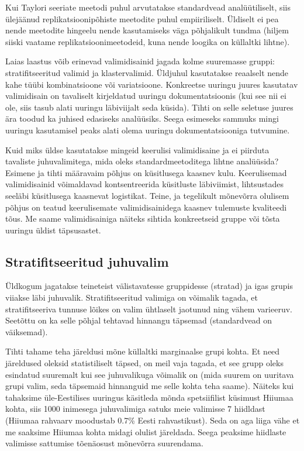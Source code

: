 \documentclass[
]{book}
\begin{document}
Kui Taylori seeriate meetodi puhul arvutatakse standardvead analüütiliselt, siis ülejäänud replikatsioonipõhiste meetodite puhul empiiriliselt. Üldiselt ei pea nende meetodite hingeelu nende kasutamiseks väga põhjalikult tundma (hiljem siiski vaatame replikatsioonimeetodeid, kuna nende loogika on küllaltki lihtne).

Laias laastus võib erinevad valimidisainid jagada kolme suuremasse gruppi: stratifitseeritud valimid ja klastervalimid. Üldjuhul kasutatakse reaalselt nende kahe tüübi kombinatsioone või variatsioone. Konkreetse uuringu juures kasutatav valimidisain on tavaliselt kirjeldatud uuringu dokumentatsioonis (kui see nii ei ole, siis tasub alati uuringu läbiviijalt seda küsida). Tihti on selle seletuse juures ära toodud ka juhised edasiseks analüüsiks. Seega esimeseks sammuks mingi uuringu kasutamisel peaks alati olema uuringu dokumentatsiooniga tutvumine.

Kuid miks üldse kasutatakse mingeid keerulisi valimidisaine ja ei piirduta tavaliste juhuvalimitega, mida oleks standardmeetoditega lihtne analüüsida? Esimene ja tihti määravaim põhjus on küsitlusega kaasnev kulu. Keerulisemad valimidisainid võimaldavad kontsentreerida küsitluste läbiviimist, lihtsustades seeläbi küsitlusega kaasnevat logistikat. Teine, ja tegelikult mõnevõrra olulisem põhjus on teatud keerulisemate valimidisainidega kaasnev tulemuste kvaliteedi tõus. Me saame valimidisainiga näiteks sihtida konkreetseid gruppe või tõsta uuringu üldist täpsusastet.

\hypertarget{stratifitseeritud-juhuvalim}{%
\subsection{Stratifitseeritud juhuvalim}\label{stratifitseeritud-juhuvalim}}

Üldkogum jagatakse teineteist välistavatesse gruppidesse (stratad) ja igas grupis viiakse läbi juhuvalik. Stratifitseeritud valimiga on võimalik tagada, et stratifitseeriva tunnuse lõikes on valim ühtlaselt jaotunud ning vähem varieeruv. Seetõttu on ka selle põhjal tehtavad hinnangu täpsemad (standardvead on väiksemad).

Tihti tahame teha järeldusi mõne küllaltki marginaalse grupi kohta. Et need järeldused oleksid statistiliselt täpsed, on meil vaja tagada, et see grupp oleks esindatud suuremalt kui see juhuvalikuga võimalik on (mida suurem on uuritava grupi valim, seda täpsemaid hinnanguid me selle kohta teha saame). Näiteks kui tahaksime üle-Eestilises uuringus käsitleda mõnda spetsiifilist küsimust Hiiumaa kohta, siis 1000 inimesega juhuvalimiga satuks meie valimisse 7 hiidldast (Hiiumaa rahvaarv moodustab 0.7\% Eesti rahvastikust). Seda on aga liiga vähe et me saaksime Hiiumaa kohta midagi olulist järeldada. Seega peaksime hiidlaste valimisse sattumise tõenäosust mõnevõrra suurendama.
\end{document}
